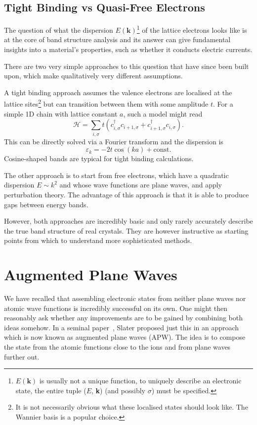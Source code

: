 \documentclass[a4paper,DIV=12,english]{scrartcl}
\begin{document}
\subsection{Tight Binding vs Quasi-Free Electrons}
The question of what the dispersion $E(\textbf{k})$\footnote{$E(\textbf{k})$ is usually not a unique function, to uniquely describe an electronic state, the entire tuple ($E$, \textbf{k}) (and possibly $\sigma$) must be specified.} of the lattice electrons looks like is at the core of band structure analysis and its answer can give fundamental insights into a material's properties, such as whether it conducts electric currents.

There are two very simple approaches to this question that have since been built upon, which make qualitatively very different assumptions.

A tight binding approach assumes the valence electrons are localised at the lattice sites\footnote{It is not necessarily obvious what these localised states should look like. The Wannier basis is a popular choice.} but can transition between them with some amplitude $t$. For a simple 1D chain with lattice constant $a$, such a model might read 
\begin{equation}
    \mathcal{H} = \sum_{i, \sigma} t \left( c^\dagger_{i,\sigma} c_{i+1,\sigma} + c^\dagger_{i+1,\sigma} c_{i,\sigma}\right).
\end{equation}
This can be directly solved via a Fourier transform and the dispersion is~\cite{theoFestkörper}
\begin{equation}
    \varepsilon_k = -2t\cos(ka) + \text{const}.
\end{equation}
Cosine-shaped bands are typical for tight binding calculations.

The other approach is to start from free electrons, which have a quadratic dispersion $E\sim k^2$ and whose wave functions are plane waves, and apply perturbation theory. The advantage of this approach is that it is able to produce gaps between energy bands.

However, both approaches are incredibly basic and only rarely accurately describe the true band structure of real crystals. They are however instructive as starting points from which to understand more sophisticated methods.


\section{Augmented Plane Waves}
We have recalled that assembling electronic states from neither plane waves nor atomic wave functions is incredibly successful on its own. One might then reasonably ask whether any improvements are to be gained by combining both ideas somehow. In a seminal paper~\cite{SLATER196435}, Slater proposed just this in an approach which is now known as augmented plane waves (APW). The idea is to compose the state from the atomic functions close to the ions and from plane waves further out.
\end{document}
